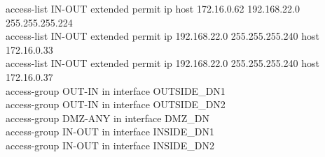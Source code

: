 \documentclass[12pt,a4paper]{report}
\begin{document}
{\hspace*{1cm}access-list IN-OUT extended permit ip host 172.16.0.62 192.168.22.0 255.255.255.224\\
\hspace*{1cm}access-list IN-OUT extended permit ip 192.168.22.0 255.255.255.240 host 172.16.0.33\\
\hspace*{1cm}access-list IN-OUT extended permit ip 192.168.22.0 255.255.255.240 host 172.16.0.37\\
\hspace*{1cm}access-group OUT-IN in interface OUTSIDE\_DN1\\
\hspace*{1cm}access-group OUT-IN in interface OUTSIDE\_DN2\\
\hspace*{1cm}access-group DMZ-ANY in interface DMZ\_DN \\
\hspace*{1cm}access-group IN-OUT in interface INSIDE\_DN1 \\
\hspace*{1cm}access-group IN-OUT in interface INSIDE\_DN2\\}
\end{document}
